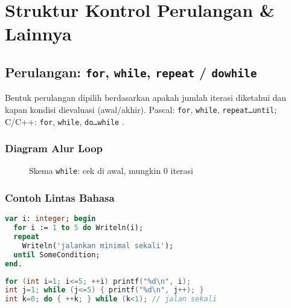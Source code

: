\documentclass[../main.tex]{subfiles}
\begin{document}
\chapter{Struktur Kontrol Perulangan \& Lainnya}
\section{Perulangan: \texttt{for}, \texttt{while}, \texttt{repeat} / \texttt{do\textendash while}}
Bentuk perulangan dipilih berdasarkan apakah jumlah iterasi diketahui dan kapan kondisi dievaluasi (awal/akhir). Pascal: \texttt{for}, \texttt{while}, \texttt{repeat\ldots until}; C/C++: \texttt{for}, \texttt{while}, \texttt{do\ldots while} \parencite{free-pascal-docs,gnu-c-manual,cpp-reference}.

\subsection{Diagram Alur Loop}
\begin{figure}[h]
  \centering
  \caption{Skema \texttt{while}: cek di awal, mungkin 0 iterasi}
\end{figure}

\subsection{Contoh Lintas Bahasa}
\begin{lstlisting}[language=Pascal, caption={for dan repeat\ldots until (Pascal)}]
var i: integer; begin
  for i := 1 to 5 do Writeln(i);
  repeat
    Writeln('jalankan minimal sekali');
  until SomeCondition;
end.
\end{lstlisting}

\begin{lstlisting}[language=C, caption={for, while, do\ldots while (C)}]
for (int i=1; i<=5; ++i) printf("%d\n", i);
int j=1; while (j<=5) { printf("%d\n", j++); }
int k=0; do { ++k; } while (k<1); // jalan sekali
\end{lstlisting}
\end{document}
